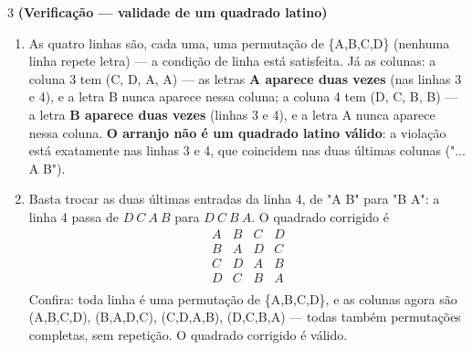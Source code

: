 \documentclass[11pt]{article}
\begin{document}
\begin{questao}{3} \textbf{(Verificação --- validade de um quadrado latino)}
\end{questao}
\begin{solucao}
\begin{enumerate}[label=(\alph*)]
  \item As quatro linhas são, cada uma, uma permutação de \{A,B,C,D\} (nenhuma linha repete
    letra) — a condição de linha está satisfeita. Já as colunas: a coluna 3 tem
    (C, D, A, A) — as letras \textbf{A aparece duas vezes} (nas linhas 3 e 4), e a letra B nunca
    aparece nessa coluna; a coluna 4 tem (D, C, B, B) — a letra \textbf{B aparece duas vezes}
    (linhas 3 e 4), e a letra A nunca aparece nessa coluna. \textbf{O arranjo não é um quadrado
    latino válido}: a violação está exatamente nas linhas 3 e 4, que coincidem nas duas últimas
    colunas ("$\dots$A B").
  \item Basta trocar as duas últimas entradas da linha 4, de "A B" para "B A": a linha 4 passa de
    $D\ C\ A\ B$ para $D\ C\ B\ A$. O quadrado corrigido é
    $$
    \begin{array}{cccc}
    A & B & C & D \\
    B & A & D & C \\
    C & D & A & B \\
    D & C & B & A \\
    \end{array}
    $$
    Confira: toda linha é uma permutação de \{A,B,C,D\}, e as colunas agora são
    (A,B,C,D), (B,A,D,C), (C,D,A,B), (D,C,B,A) — todas também permutações completas, sem
    repetição. O quadrado corrigido é válido.
\end{enumerate}
\end{solucao}
\end{document}
